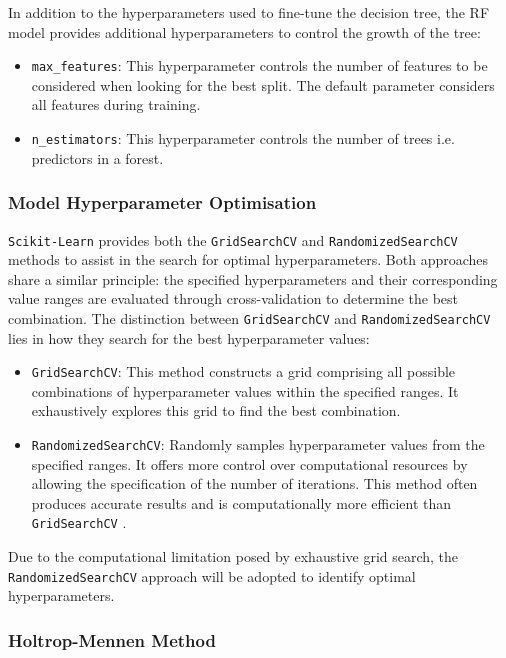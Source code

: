 \documentclass[]{interact}
\theoremstyle{plain}%
\theoremstyle{definition}
\theoremstyle{remark}
\begin{document}
In addition to the hyperparameters used to fine-tune the decision tree, the RF model provides additional hyperparameters to control the growth of the tree:

\begin{itemize}
  \item \texttt{max\_features}: This hyperparameter controls the number of features to be considered when looking for the best split. The default parameter considers all features during training.
  \item \texttt{n\_estimators}: This hyperparameter controls the number of trees i.e. predictors in a forest.
\end{itemize}

\subsubsection{Model Hyperparameter Optimisation}\label{sec:hpo_opti_J}

\texttt{Scikit-Learn} provides both the {\tt GridSearchCV} and {\tt RandomizedSearchCV} methods to assist in the search for optimal hyperparameters. Both approaches share a similar principle: the specified hyperparameters and their corresponding value ranges are evaluated through cross-validation to determine the best combination. The distinction between {\tt GridSearchCV} and {\tt RandomizedSearchCV} lies in how they search for the best hyperparameter values:

\begin{itemize}
  \item {\tt GridSearchCV}: This method constructs a grid comprising all possible combinations of hyperparameter values within the specified ranges. It exhaustively explores this grid to find the best combination.
  \item {\tt RandomizedSearchCV}: Randomly samples hyperparameter values from the specified ranges. It offers more control over computational resources by allowing the specification of the number of iterations. This method often produces accurate results and is computationally more efficient than {\tt GridSearchCV} \citep{J.Bergstra.2012}.
\end{itemize}

Due to the computational limitation posed by exhaustive grid search, the {\tt RandomizedSearchCV} approach will be adopted to identify optimal hyperparameters. 

\subsubsection{Holtrop-Mennen Method}\label{sec:Holtrop_mennen_j}
\end{document}
